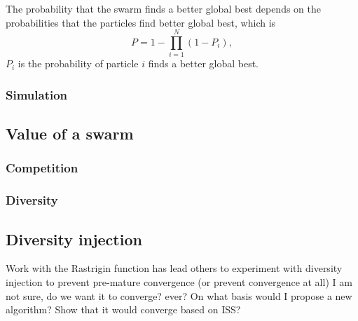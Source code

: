 \begin{mythm}
The probability that the swarm finds a better global best depends on the probabilities that the particles find better global best, which is
\begin{equation}
P = 1 - \prod_{i=1}^{N} ( 1 - P_{i} ),
\end{equation}
$ P_{i} $ is the probability of particle $ i $ finds a better global best.
\end{mythm}

\subsubsection{Simulation}

\subsection{Value of a swarm}




\subsubsection{Competition}



\subsubsection{Diversity}


\subsection{Diversity injection}

Work with the Rastrigin function has lead others to experiment with diversity injection to prevent pre-mature convergence (or prevent convergence at all)
I am not sure, do we want it to converge? ever?
On what basis would I propose a new algorithm?
Show that it would converge based on ISS?